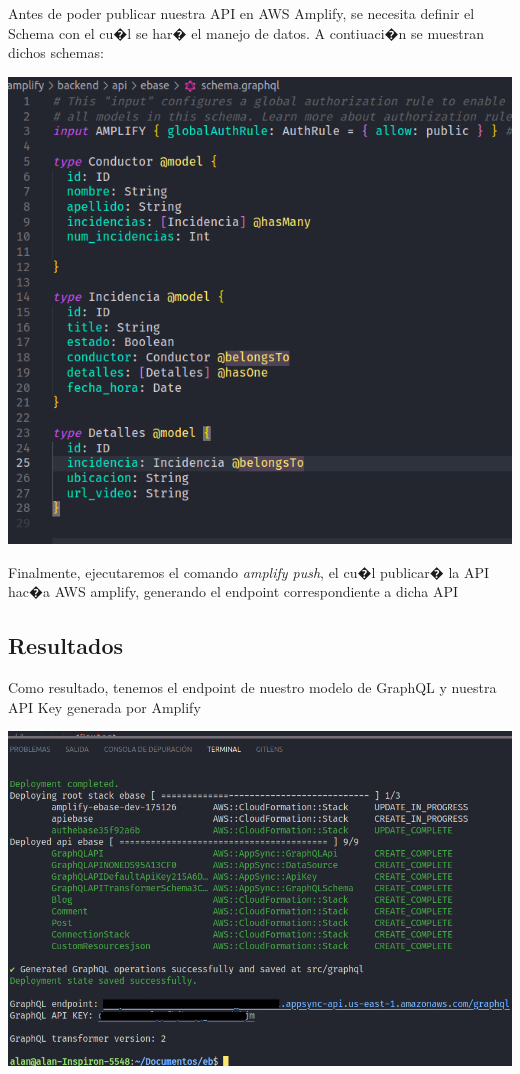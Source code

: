 \documentclass[12pt,letterpaper]{article}
\begin{document}
Antes de poder publicar nuestra API en AWS Amplify, se necesita definir el Schema con el cu�l se har� el manejo de datos. A contiuaci�n se muestran dichos schemas:

\begin{center}
  \includegraphics[scale=0.55]{imagenes/schema}
 \label{fig:MongoA} 
\end{center} 

Finalmente, ejecutaremos el comando \emph{amplify push}, el cu�l publicar� la API hac�a AWS amplify, generando el endpoint correspondiente a dicha API


	

\subsection{Resultados}

Como resultado, tenemos el endpoint de nuestro modelo de GraphQL y nuestra API Key generada por Amplify

\begin{center}
  \includegraphics[scale=0.55]{imagenes/endpoints}
 \label{fig:MongoA} 
\end{center} 
\end{document}
